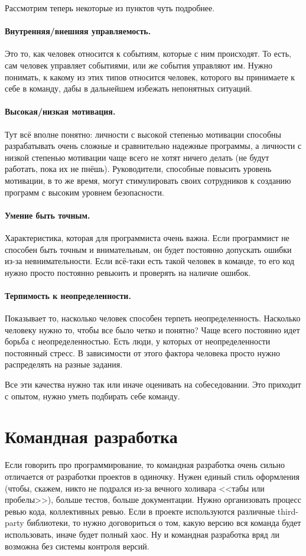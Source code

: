 \documentclass{../../text-style}
\begin{document}
Рассмотрим теперь некоторые из пунктов чуть подробнее.

\paragraph*{Внутренняя/внешняя управляемость.} Это то, как человек относится к событиям, которые с ним происходят. То есть, сам человек управляет событиями, или же события управляют им. Нужно понимать, к какому из этих типов относится человек, которого вы принимаете к себе в команду, дабы в дальнейшем избежать непонятных ситуаций.

\paragraph*{Высокая/низкая мотивация.} Тут всё вполне понятно: личности с высокой степенью мотивации способны разрабатывать очень сложные и сравнительно надежные программы, а личности с низкой степенью мотивации чаще всего не хотят ничего делать (не будут работать, пока их не пнёшь). Руководители, способные повысить уровень мотивации, в то же время, могут стимулировать своих сотрудников к созданию программ с высоким уровнем безопасности.

\paragraph*{Умение быть точным.} Характеристика, которая для программиста очень важна. Если программист не способен быть точным и внимательным, он будет постоянно допускать ошибки из-за невнимательности. Если всё-таки есть такой человек в команде, то его код нужно просто постоянно ревьюить и проверять на наличие ошибок.

\paragraph*{Терпимость к неопределенности.} Показывает то, насколько человек способен терпеть неопределенность. Насколько человеку нужно то, чтобы все было четко и понятно? Чаще всего постоянно идет борьба с неопределенностью. Есть люди, у которых от неопределенности постоянный стресс. В зависимости от этого фактора человека просто нужно распределять на разные задания.

Все эти качества нужно так или иначе оценивать на собеседовании. Это приходит с опытом, нужно уметь подбирать себе команду.

\section{Командная разработка}

Если говорить про программирование, то командная разработка очень сильно отличается от разработки проектов в одиночку. Нужен единый стиль оформления (чтобы, скажем, никто не подрался из-за вечного холивара <<табы или пробелы>>), больше тестов, больше документации. Нужно организовать процесс ревью кода, коллективных ревью. Если в проекте используются различные third-party библиотеки, то нужно договориться о том, какую версию вся команда будет использовать, иначе будет полный хаос. Ну и командная разработка вряд ли возможна без системы контроля версий.
\end{document}
